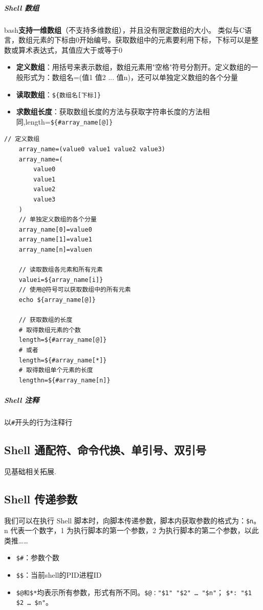 \documentclass[UTF8,a4paper,12pt]{ctexbook}
\begin{document}
				\subparagraph{Shell 数组}
					bash\textbf{支持一维数组}（不支持多维数组），并且没有限定数组的大小。
					类似与C语言，数组元素的下标由0开始编号。获取数组中的元素要利用下标，下标可以是整数或算术表达式，其值应大于或等于0
					\begin{itemize}
						\item  \textbf{定义数组}：用括号来表示数组，数组元素用"空格"符号分割开。定义数组的一般形式为：数组名=(值1 值2 ... 值n)，还可以单独定义数组的各个分量
						 
						\item  \textbf{读取数组}：\verb|${数组名[下标]}|
						\item  \textbf{求数组长度}：获取数组长度的方法与获取字符串长度的方法相同,length=\verb|${#array_name[@]}|
					\end{itemize}
				
					\begin{lstlisting}[xleftmargin=.06\textwidth]
	// 定义数组
	array_name=(value0 value1 value2 value3)
	array_name=(
		value0
		value1
		value2
		value3
	)
	// 单独定义数组的各个分量
	array_name[0]=value0
	array_name[1]=value1
	array_name[n]=valuen
	
	// 读取数组各元素和所有元素
	valuei=${array_name[i]}
	// 使用@符号可以获取数组中的所有元素
	echo ${array_name[@]}
	
	// 获取数组的长度 
	# 取得数组元素的个数
	length=${#array_name[@]}
	# 或者
	length=${#array_name[*]}
	# 取得数组单个元素的长度
	lengthn=${#array_name[n]}
					\end{lstlisting}
				\subparagraph{Shell 注释}
					以\verb|#|开头的行为注释行
				
				
		 \subsection{Shell 通配符、命令代换、单引号、双引号}
			 见基础相关拓展.
	 
		 \subsection{Shell 传递参数}
			 我们可以在执行 Shell 脚本时，向脚本传递参数，脚本内获取参数的格式为：\verb|$n|。n 代表一个数字，1 为执行脚本的第一个参数，2 为执行脚本的第二个参数，以此类推……
			 
			 \begin{itemize}
			 	\item  \verb|$#|：参数个数
			 	\item  \verb|$$|：当前shell的PID进程ID
			 	\item  \verb|$@和$*|均表示所有参数，形式有所不同。\verb|$@："$1" "$2" … "$n"|； \verb|$*: "$1 $2 … $n"|。
			 \end{itemize}
			 
\end{document}
